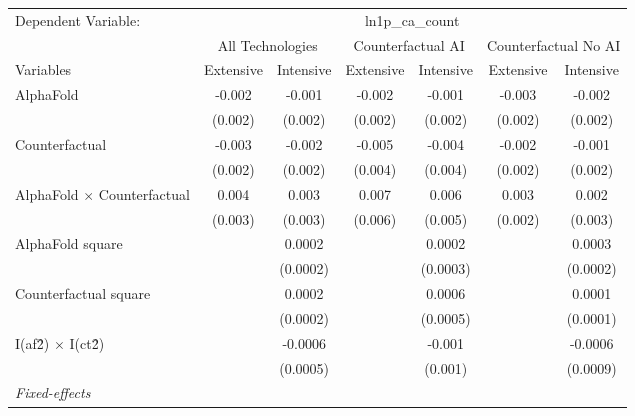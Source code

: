 \begingroup
\centering
\begin{tabular}{lcccccc}
   \tabularnewline \midrule \midrule
   Dependent Variable: & \multicolumn{6}{c}{ln1p\_ca\_count}\\
 & \multicolumn{2}{c}{All Technologies} & \multicolumn{2}{c}{Counterfactual AI} & \multicolumn{2}{c}{Counterfactual No AI} \\
\cmidrule(lr){1-1}\cmidrule(lr){2-3} \cmidrule(lr){4-5} \cmidrule(lr){6-7}
Variables & \multicolumn{1}{c}{Extensive} & \multicolumn{1}{c}{Intensive} & \multicolumn{1}{c}{Extensive} & \multicolumn{1}{c}{Intensive} & \multicolumn{1}{c}{Extensive} & \multicolumn{1}{c}{Intensive} \\
\cmidrule(lr){1-1}\cmidrule(lr){2-2} \cmidrule(lr){3-3} \cmidrule(lr){4-4} \cmidrule(lr){5-5} \cmidrule(lr){6-6} \cmidrule(lr){7-7}
   AlphaFold                          & -0.002  & -0.001   & -0.002  & -0.001   & -0.003  & -0.002\\   
                                      & (0.002) & (0.002)  & (0.002) & (0.002)  & (0.002) & (0.002)\\   
   Counterfactual                     & -0.003  & -0.002   & -0.005  & -0.004   & -0.002  & -0.001\\   
                                      & (0.002) & (0.002)  & (0.004) & (0.004)  & (0.002) & (0.002)\\   
   AlphaFold $\times$ Counterfactual  & 0.004   & 0.003    & 0.007   & 0.006    & 0.003   & 0.002\\   
                                      & (0.003) & (0.003)  & (0.006) & (0.005)  & (0.002) & (0.003)\\   
   AlphaFold square                   &         & 0.0002   &         & 0.0002   &         & 0.0003\\   
                                      &         & (0.0002) &         & (0.0003) &         & (0.0002)\\   
   Counterfactual square              &         & 0.0002   &         & 0.0006   &         & 0.0001\\   
                                      &         & (0.0002) &         & (0.0005) &         & (0.0001)\\   
   I(af\^2) $\times$ I(ct\^2)         &         & -0.0006  &         & -0.001   &         & -0.0006\\   
                                      &         & (0.0005) &         & (0.001)  &         & (0.0009)\\   
   \midrule
   \emph{Fixed-effects}\\

\end{tabular}
